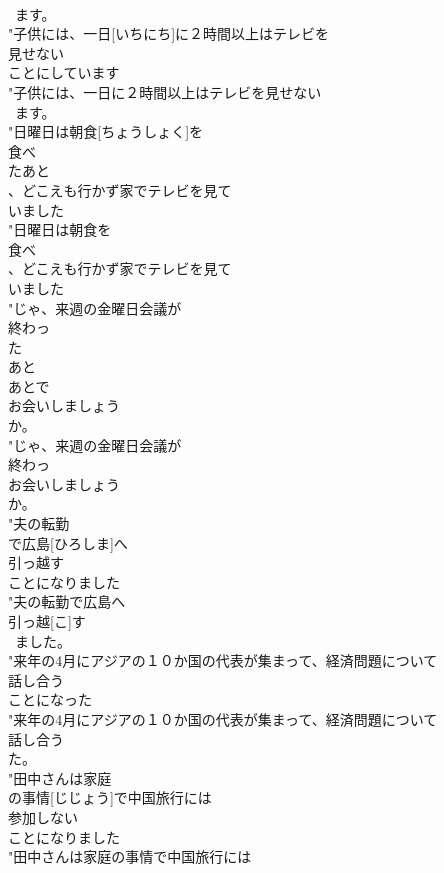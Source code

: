 \documentclass[8pt]{extreport}
\begin{document}
\begin{CJK}{UTF8}{min}
\\	~ます。
\\	"子供には、一日[いちにち]に２時間以上はテレビを
\\	見せない
\\	ことにしています
\\	"子供には、一日に２時間以上はテレビを見せない
\\	~ます。
\\	"日曜日は朝食[ちょうしょく]を
\\	食べ
\\	たあと
\\	、どこえも行かず家でテレビを見て
\\	いました
\\	"日曜日は朝食を
\\	食べ
\\	、どこえも行かず家でテレビを見て
\\	いました
\\	"じゃ、来週の金曜日会議が
\\	終わっ
\\	た
\\	あと
\\	あとで
\\	お会いしましょう
\\	か。
\\	"じゃ、来週の金曜日会議が
\\	終わっ
\\	お会いしましょう
\\	か。
\\	"夫の転勤
\\	で広島[ひろしま]へ
\\	引っ越す
\\	ことになりました
\\	"夫の転勤で広島へ
\\	引っ越[こ]す
\\	~ました。
\\	"来年の4月にアジアの１０か国の代表が集まって、経済問題について
\\	話し合う
\\	ことになった
\\	"来年の4月にアジアの１０か国の代表が集まって、経済問題について
\\	話し合う
\\	た。
\\	"田中さんは家庭
\\	の事情[じじょう]で中国旅行には
\\	参加しない
\\	ことになりました
\\	"田中さんは家庭の事情で中国旅行には

\end{CJK}
\end{document}
